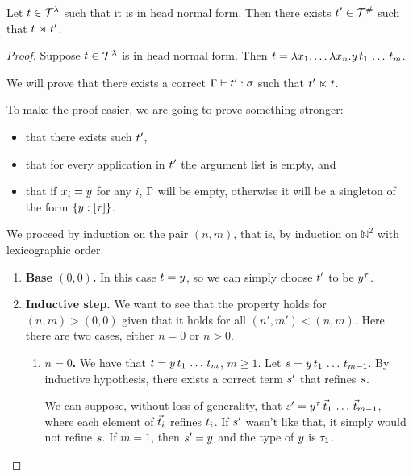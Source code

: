 \begin{lemma}
Let $t \in \mathcal{T}^{\lambda}$ such that it is in head normal form.
 Then there exists $t' \in \mathcal{T}^{\mathtt{\#}}$ such that $t \mathrel{\rtimes} t'$.
\end{lemma}
\begin{proof}
Suppose $t \in \mathcal{T}^{\lambda}$ is in head normal form.
Then $t = \lambda x_1. \hdots\lambda x_n. y\,t_1\,\hdots\,t_m$.

We will prove that there exists a correct $\Gamma \vdash t' : \sigma$ such that $t' \mathrel{\ltimes} t$.

To make the proof easier, we are going to prove something stronger:
  \begin{itemize}
    \item that there exists such $t'$,
    \item that for every application in $t'$ the argument list is empty, and
    \item that if $x_i = y$ for any $i$, $\Gamma$ will be empty,
      otherwise it will be a singleton of the form $\{y : [\tau]\}$.
  \end{itemize}

We proceed by induction on the pair $(n, m)$, that is, by induction on
  $\mathbb{N}^2$ with lexicographic order.

\begin{enumerate}
  \item {\bf Base $(0, 0)$.} In this case $t = y$,
    so we can simply choose $t'$ to be $y^\tau$.
  \item {\bf Inductive step.} We want to see that the property holds for
    $(n, m) > (0,0)$ given that it holds for all $(n', m') < (n, m)$.
    Here there are two cases, either $n = 0$ or $n > 0$.
    \begin{enumerate}
      \item {\bf $n = 0$.} We have that $t = y\,t_1\,\hdots\,t_m$, $m \geq 1$.
        Let $s = y\,t_1\,\hdots\,t_{m-1}$.
        By inductive hypothesis, there exists a correct term $s'$ that
          refines $s$.

        We can suppose, without loss of generality, that
          $s' = y^\tau\,\vec{t}_1\,\hdots\,\vec{t}_{m-1}$,
        where each element of $\vec{t}_i$ refines $t_i$.
        If $s'$ wasn't like that, it simply would not refine $s$.
        If $m = 1$, then $s' = y$ and the type of $y$ is $\tau_1$.


\end{enumerate}
\end{enumerate}
\end{proof}
